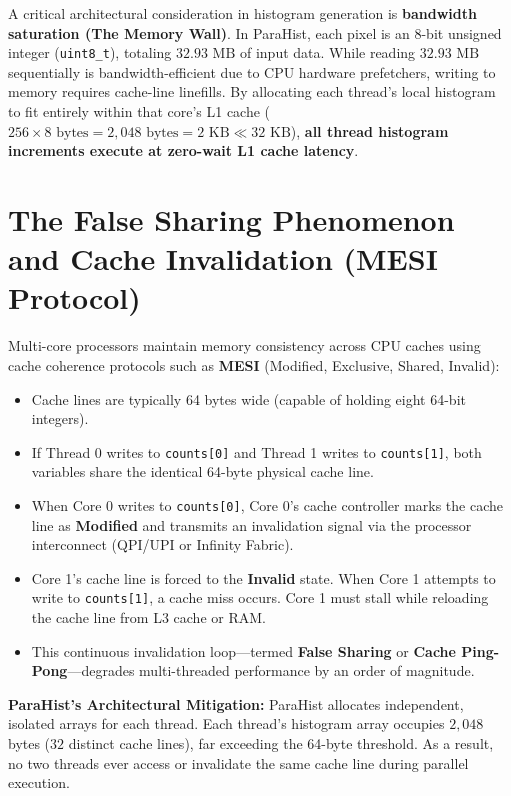 \documentclass[12pt,a4paper,oneside]{report}
\begin{document}
A critical architectural consideration in histogram generation is \textbf{bandwidth saturation (The Memory Wall)}. In ParaHist, each pixel is an 8-bit unsigned integer (\texttt{uint8\_t}), totaling $32.93\text{ MB}$ of input data. While reading $32.93\text{ MB}$ sequentially is bandwidth-efficient due to CPU hardware prefetchers, writing to memory requires cache-line linefills. By allocating each thread's local histogram to fit entirely within that core's L1 cache ($256 \times 8\text{ bytes} = 2,048\text{ bytes} = 2\text{ KB} \ll 32\text{ KB}$), \textbf{all thread histogram increments execute at zero-wait L1 cache latency}.

\section{The False Sharing Phenomenon and Cache Invalidation (MESI Protocol)}
Multi-core processors maintain memory consistency across CPU caches using cache coherence protocols such as \textbf{MESI} (Modified, Exclusive, Shared, Invalid):
\begin{itemize}
    \item Cache lines are typically 64 bytes wide (capable of holding eight 64-bit integers).
    \item If Thread 0 writes to \texttt{counts[0]} and Thread 1 writes to \texttt{counts[1]}, both variables share the identical 64-byte physical cache line.
    \item When Core 0 writes to \texttt{counts[0]}, Core 0's cache controller marks the cache line as \textbf{Modified} and transmits an invalidation signal via the processor interconnect (QPI/UPI or Infinity Fabric).
    \item Core 1's cache line is forced to the \textbf{Invalid} state. When Core 1 attempts to write to \texttt{counts[1]}, a cache miss occurs. Core 1 must stall while reloading the cache line from L3 cache or RAM.
    \item This continuous invalidation loop---termed \textbf{False Sharing} or \textbf{Cache Ping-Pong}---degrades multi-threaded performance by an order of magnitude.
\end{itemize}

\textbf{ParaHist's Architectural Mitigation:}  
ParaHist allocates independent, isolated arrays for each thread. Each thread's histogram array occupies $2,048$ bytes ($32$ distinct cache lines), far exceeding the 64-byte threshold. As a result, no two threads ever access or invalidate the same cache line during parallel execution.
\end{document}
